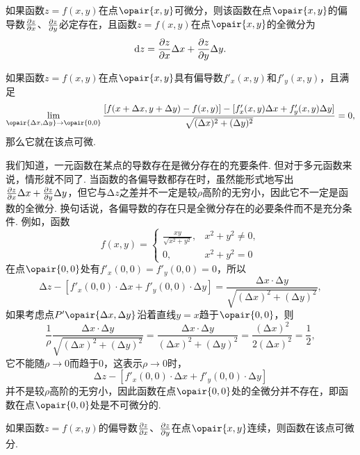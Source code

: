 \begin{theorem}[必要条件]\label{theorem:多元函数微分法.二元函数可微的必要条件}
如果函数\(z=f(x,y)\)在点\(\opair{x,y}\)可微分，则该函数在点\(\opair{x,y}\)的偏导数\(\pdv{z}{x}\)、\(\pdv{z}{y}\)必定存在，且函数\(z=f(x,y)\)在点\(\opair{x,y}\)的全微分为\[
\dd{z} = \pdv{z}{x} \Delta x + \pdv{z}{y} \Delta y.
\]
\end{theorem}

\begin{corollary}
如果函数\(z=f(x,y)\)在点\(\opair{x,y}\)具有偏导数\(f'_x(x,y)\)和\(f'_y(x,y)\)，且满足\[
\lim\limits_{\opair{\increment x,\increment y}\to\opair{0,0}}
 \frac{[f(x+\increment x,y+\increment y)-f(x,y)]-[f'_x(x,y) \increment x + f'_y(x,y) \increment y]}{\sqrt{(\increment x)^2+(\increment y)^2}} = 0,
\]那么它就在该点可微.
\end{corollary}

我们知道，一元函数在某点的导数存在是微分存在的充要条件.
但对于多元函数来说，情形就不同了.
当函数的各偏导数都存在时，虽然能形式地写出\(\pdv{z}{x} \Delta x + \pdv{z}{y} \Delta y\)，但它与\(\increment z\)之差并不一定是较\(\rho\)高阶的无穷小，因此它不一定是函数的全微分.
换句话说，各偏导数的存在只是全微分存在的必要条件而不是充分条件.
例如，函数\[
f(x,y) = \left\{ \begin{array}{cl}
\frac{xy}{\sqrt{x^2+y^2}}, & x^2+y^2 \neq 0, \\
0, & x^2+y^2 = 0
\end{array} \right.
\]在点\(\opair{0,0}\)处有\(f'_x(0,0) = f'_y(0,0) = 0\)，所以\[
\increment z - [f'_x(0,0) \cdot \increment x + f'_y(0,0) \cdot \increment y]
= \frac{\increment x \cdot \increment y}{\sqrt{(\increment x)^2+(\increment y)^2}},
\]如果考虑点\(P'\opair{\increment x,\increment y}\)沿着直线\(y=x\)趋于\(\opair{0,0}\)，则\[
\frac{1}{\rho} \frac{\increment x \cdot \increment y}{\sqrt{(\increment x)^2+(\increment y)^2}}
= \frac{\increment x \cdot \increment y}{(\increment x)^2+(\increment y)^2}
= \frac{(\increment x)^2}{2(\increment x)^2}
= \frac{1}{2},
\]它不能随\(\rho\to0\)而趋于\(0\)，这表示\(\rho\to0\)时，\[
\increment z - [f'_x(0,0) \cdot \increment x + f'_y(0,0) \cdot \increment y]
\]并不是较\(\rho\)高阶的无穷小，因此函数在点\(\opair{0,0}\)处的全微分并不存在，即函数在点\(\opair{0,0}\)处是不可微分的.

\begin{theorem}[充分条件]\label{theorem:多元函数微分法.二元函数可微的充分条件}
如果函数\(z=f(x,y)\)的偏导数\(\pdv{z}{x}\)、\(\pdv{z}{y}\)在点\(\opair{x,y}\)连续，则函数在该点可微分.
\end{theorem}

